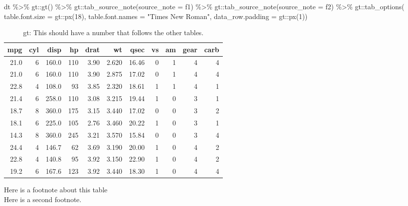 \documentclass[
  letterpaper,
  oneside]{scrbook}
\newenvironment{Shaded}{\begin{snugshade}}{\end{snugshade}}
\newcommand{\AttributeTok}[1]{\textcolor[rgb]{0.40,0.45,0.13}{#1}}
\newcommand{\DecValTok}[1]{\textcolor[rgb]{0.68,0.00,0.00}{#1}}
\newcommand{\FunctionTok}[1]{\textcolor[rgb]{0.28,0.35,0.67}{#1}}
\newcommand{\NormalTok}[1]{\textcolor[rgb]{0.00,0.23,0.31}{#1}}
\newcommand{\SpecialCharTok}[1]{\textcolor[rgb]{0.37,0.37,0.37}{#1}}
\newcommand{\StringTok}[1]{\textcolor[rgb]{0.13,0.47,0.30}{#1}}
\begin{document}
\begin{Shaded}
\begin{Highlighting}[]
\NormalTok{dt }\SpecialCharTok{\%\textgreater{}\%}
\NormalTok{  gt}\SpecialCharTok{::}\FunctionTok{gt}\NormalTok{() }\SpecialCharTok{\%\textgreater{}\%}
\NormalTok{  gt}\SpecialCharTok{::}\FunctionTok{tab\_source\_note}\NormalTok{(}\AttributeTok{source\_note =}\NormalTok{ f1) }\SpecialCharTok{\%\textgreater{}\%}
\NormalTok{  gt}\SpecialCharTok{::}\FunctionTok{tab\_source\_note}\NormalTok{(}\AttributeTok{source\_note =}\NormalTok{ f2) }\SpecialCharTok{\%\textgreater{}\%}
\NormalTok{  gt}\SpecialCharTok{::}\FunctionTok{tab\_options}\NormalTok{(}
      \AttributeTok{table.font.size =}\NormalTok{ gt}\SpecialCharTok{::}\FunctionTok{px}\NormalTok{(}\DecValTok{18}\NormalTok{), }
      \AttributeTok{table.font.names =} \StringTok{"Times New Roman"}\NormalTok{,}
      \AttributeTok{data\_row.padding =}\NormalTok{ gt}\SpecialCharTok{::}\FunctionTok{px}\NormalTok{(}\DecValTok{1}\NormalTok{))}
\end{Highlighting}
\end{Shaded}

\hypertarget{tbl-gt}{}
\setlength{\LTpost}{0mm}
\begin{longtable}{rrrrrrrrrrr}
\caption{\label{tbl-gt}gt: This should have a number that follows the other tables. }\tabularnewline

\toprule
mpg & cyl & disp & hp & drat & wt & qsec & vs & am & gear & carb \\ 
\midrule
21.0 & 6 & 160.0 & 110 & 3.90 & 2.620 & 16.46 & 0 & 1 & 4 & 4 \\ 
21.0 & 6 & 160.0 & 110 & 3.90 & 2.875 & 17.02 & 0 & 1 & 4 & 4 \\ 
22.8 & 4 & 108.0 & 93 & 3.85 & 2.320 & 18.61 & 1 & 1 & 4 & 1 \\ 
21.4 & 6 & 258.0 & 110 & 3.08 & 3.215 & 19.44 & 1 & 0 & 3 & 1 \\ 
18.7 & 8 & 360.0 & 175 & 3.15 & 3.440 & 17.02 & 0 & 0 & 3 & 2 \\ 
18.1 & 6 & 225.0 & 105 & 2.76 & 3.460 & 20.22 & 1 & 0 & 3 & 1 \\ 
14.3 & 8 & 360.0 & 245 & 3.21 & 3.570 & 15.84 & 0 & 0 & 3 & 4 \\ 
24.4 & 4 & 146.7 & 62 & 3.69 & 3.190 & 20.00 & 1 & 0 & 4 & 2 \\ 
22.8 & 4 & 140.8 & 95 & 3.92 & 3.150 & 22.90 & 1 & 0 & 4 & 2 \\ 
19.2 & 6 & 167.6 & 123 & 3.92 & 3.440 & 18.30 & 1 & 0 & 4 & 4 \\ 
\bottomrule
\end{longtable}
\begin{minipage}{\linewidth}
Here is a footnote about this table\\
Here is a second footnote.\\
\end{minipage}
\end{document}
